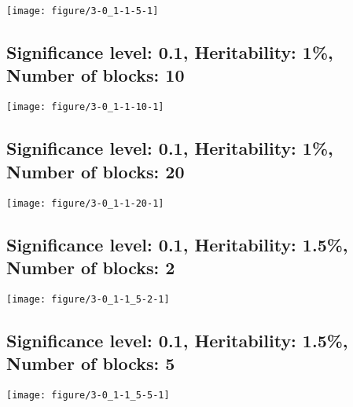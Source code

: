 \documentclass[11pt,letter]{article}\usepackage[]{graphicx}\usepackage[]{color}
\makeatletter
\def\maxwidth{ %
  \ifdim\Gin@nat@width>\linewidth
    \linewidth
  \else
    \Gin@nat@width
  \fi
}
\newenvironment{knitrout}{}{} %
\makeatother
\begin{document}
\begin{knitrout}
\color{fgcolor}
\texttt{[image: figure/3-0\_1-1-5-1]} 

\end{knitrout}

\newpage
\subsection{Significance level: 0.1, Heritability: 1\%, Number of blocks: 10}

\begin{knitrout}
\color{fgcolor}
\texttt{[image: figure/3-0\_1-1-10-1]} 

\end{knitrout}

\newpage
\subsection{Significance level: 0.1, Heritability: 1\%, Number of blocks: 20}

\begin{knitrout}
\color{fgcolor}
\texttt{[image: figure/3-0\_1-1-20-1]} 

\end{knitrout}

\newpage
\subsection{Significance level: 0.1, Heritability: 1.5\%, Number of blocks: 2}

\begin{knitrout}
\color{fgcolor}
\texttt{[image: figure/3-0\_1-1\_5-2-1]} 

\end{knitrout}

\newpage
\subsection{Significance level: 0.1, Heritability: 1.5\%, Number of blocks: 5}

\begin{knitrout}
\color{fgcolor}
\texttt{[image: figure/3-0\_1-1\_5-5-1]} 

\end{knitrout}
\end{document}
